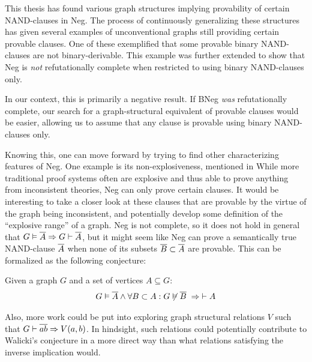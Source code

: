 This thesis has found various graph structures implying provability of certain NAND-clauses in Neg.
The process of continuously generalizing these structures has given several examples of unconventional graphs still providing certain provable clauses.
One of these exemplified that some provable binary NAND-clauses are not binary-derivable.
This example was further extended to show that Neg is \textit{not} refutationally complete when restricted to using binary NAND-clauses only.

In our context, this is primarily a negative result.
If BNeg \textit{was} refutationally complete, our search for a graph-structural equivalent of provable clauses would be easier, allowing us to assume that any clause is provable using binary NAND-clauses only.

Knowing this, one can move forward by trying to find other characterizing features of Neg.
One example is its non-explosiveness, mentioned in \cite{michal-completeness}
While more traditional proof systems often are explosive and thus able to prove anything from inconsistent theories, Neg can only prove certain clauses.
It would be interesting to take a closer look at these clauses that are provable by the virtue of the graph being inconsistent, and potentially develop some definition of the ``explosive range'' of a graph.
Neg is not complete, so it does not hold in general that $G \vDash \ol{A} \Rightarrow G \vdash \ol{A}$, but it might seem like Neg can prove a semantically true NAND-clause $\ol{A}$ when none of its subsets $\ol{B} \subset \ol{A}$ are provable.
This can be formalized as the following conjecture:
\begin{conjecture}
  Given a graph $G$ and a set of vertices $A \subseteq G$:
  \begin{align}
    G \vDash \ol{A} \wedge \forall B \subset A: G \not\vDash \ol{ B } \;\Rightarrow \; \vdash A
  \end{align}
\end{conjecture}

Also, more work could be put into exploring graph structural relations $V$ such that $G \vdash \ol{ab} \Rightarrow V(a,b)$.
In hindsight, such relations could potentially contribute to Walicki's conjecture in a more direct way than what relations satisfying the inverse implication would.

